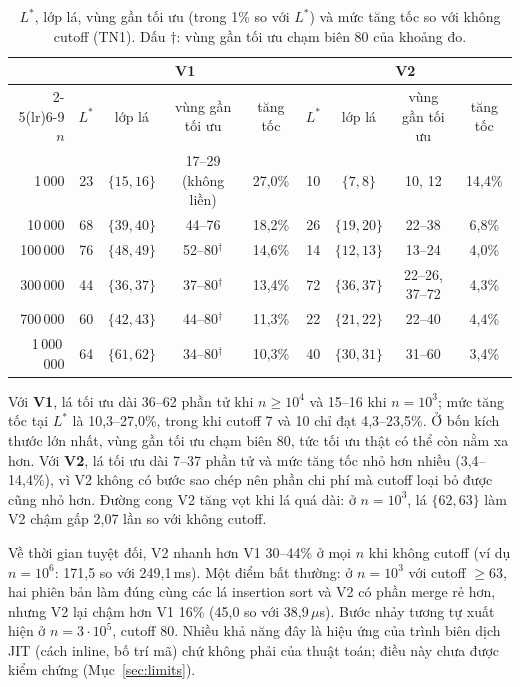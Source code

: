 \documentclass[11pt,a4paper]{article}
\begin{document}
\begin{table}[H]
\centering
\small
\begin{tabular}{rcccccccc}
\toprule
& \multicolumn{4}{c}{V1} & \multicolumn{4}{c}{V2} \\
\cmidrule(lr){2-5}\cmidrule(lr){6-9}
$n$ & $L^*$ & lớp lá & vùng gần tối ưu & tăng tốc & $L^*$ & lớp lá & vùng gần tối ưu & tăng tốc \\
\midrule
1\,000      & 23 & $\{15,16\}$ & 17--29 (không liền) & 27,0\% & 10 & $\{7,8\}$ & 10, 12 & 14,4\% \\
10\,000     & 68 & $\{39,40\}$ & 44--76 & 18,2\% & 26 & $\{19,20\}$ & 22--38 & 6,8\% \\
100\,000    & 76 & $\{48,49\}$ & 52--80$^\dagger$ & 14,6\% & 14 & $\{12,13\}$ & 13--24 & 4,0\% \\
300\,000    & 44 & $\{36,37\}$ & 37--80$^\dagger$ & 13,4\% & 72 & $\{36,37\}$ & 22--26, 37--72 & 4,3\% \\
700\,000    & 60 & $\{42,43\}$ & 44--80$^\dagger$ & 11,3\% & 22 & $\{21,22\}$ & 22--40 & 4,4\% \\
1\,000\,000 & 64 & $\{61,62\}$ & 34--80$^\dagger$ & 10,3\% & 40 & $\{30,31\}$ & 31--60 & 3,4\% \\
\bottomrule
\end{tabular}
\caption{$L^*$, lớp lá, vùng gần tối ưu (trong 1\% so với $L^*$) và mức tăng tốc so với không cutoff (TN1).
Dấu $\dagger$: vùng gần tối ưu chạm biên 80 của khoảng đo.}
\label{tab:lstar}
\end{table}

Với \textbf{V1}, lá tối ưu dài 36--62 phần tử khi $n \ge 10^4$ và 15--16 khi $n = 10^3$; mức tăng tốc tại $L^*$
là 10,3--27,0\%, trong khi cutoff 7 và 10 chỉ đạt 4,3--23,5\%. Ở bốn kích thước lớn nhất, vùng gần tối ưu chạm biên
80, tức tối ưu thật có thể còn nằm xa hơn. Với \textbf{V2}, lá tối ưu dài 7--37 phần tử và mức tăng tốc nhỏ hơn
nhiều (3,4--14,4\%), vì V2 không có bước sao chép nên phần chi phí mà cutoff loại bỏ được cũng nhỏ hơn.
Đường cong V2 tăng vọt khi lá quá dài: ở $n=10^3$, lá $\{62,63\}$ làm V2 chậm gấp 2,07 lần so với không cutoff.

Về thời gian tuyệt đối, V2 nhanh hơn V1 30--44\% ở mọi $n$ khi không cutoff (ví dụ $n = 10^6$: 171,5 so với 249,1\,ms).
Một điểm bất thường: ở $n=10^3$ với cutoff $\ge 63$, hai phiên bản làm đúng cùng các lá insertion sort và V2 có
phần merge rẻ hơn, nhưng V2 lại chậm hơn V1 16\% (45,0 so với 38,9\,$\mu$s). Bước nhảy tương tự xuất hiện ở
$n=3\cdot 10^5$, cutoff 80. Nhiều khả năng đây là hiệu ứng của trình biên dịch JIT (cách inline, bố trí mã)
chứ không phải của thuật toán; điều này chưa được kiểm chứng (Mục~\ref{sec:limits}).
\end{document}
